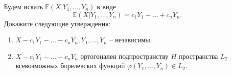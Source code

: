 \begin{ordre}
Будем искать 
${\mathbb E}(X|Y_1,\ldots,Y_n)$ в виде 
$$
\label{Gauss}
{\mathbb E}(X|Y_1,\ldots,Y_n)=c_1 Y_1+\ldots +c_n Y_n . 
$$
Докажите следующие утверждения:

\begin{enumerate}
\item $X-c_1 Y_1-\ldots-c_n Y_n, Y_1,\ldots, Y_n$ -- независимы.
\item $X-c_1 Y_1-\ldots-c_n Y_n$ ортогонален подпространству $H$ пространства $L_2$ всевозможных борелевских функций $\varphi(Y_1,\ldots,Y_n)\in L_2$.
\end{enumerate}
 
\end{ordre}


\begin{comment}
\begin{problem}
Некто обладает одной облигацией, которую намеревается продать в один из последующих четырех дней, в которых цена облигации 
принимает различные значения, априори неизвестные, но становящиеся известными в начале каждого дня продаж. Предполагается, что 
цены облигации независимы и их перестановки по торговым дням равновозможны. Какова стратегия продавца, состоящая в выборе дня 
продажи облигации и гарантирующая максимальную вероятность того, что он продаст облигацию в день ее наибольшей цены? 
\end{problem}

\begin{ordre}
Рассмотреть следующие возможные стратегии и сравнить вероятности продажи облигации в день наибольшей цены: 
\begin{enumerate}
\item на первом шаге (в первый день торгов) запомним имевшую место цену облигации, не продавая ее, а затем продадим 
облигацию в тот день, когда ее цена окажется большей цены, зафиксированной в первый день, или (когда такого дня не окажется) в 
последний (четвертый) день, независимо от цены этого дня (стратегия $S_1$); 

\item не продавая облигацию в первом и втором торговых днях, зафиксируем  максимальную цену из двух, имевших место для этих дней, 
и продадим облигацию в третьем торговом дне, если цена облигации в нем будет выше, чем указанная зафиксированная максимальная цена, 
или, в противном случае, в четвертом дне (стратегия $S_2$). 
\end{enumerate}
\end{ordre}
\end{comment}

